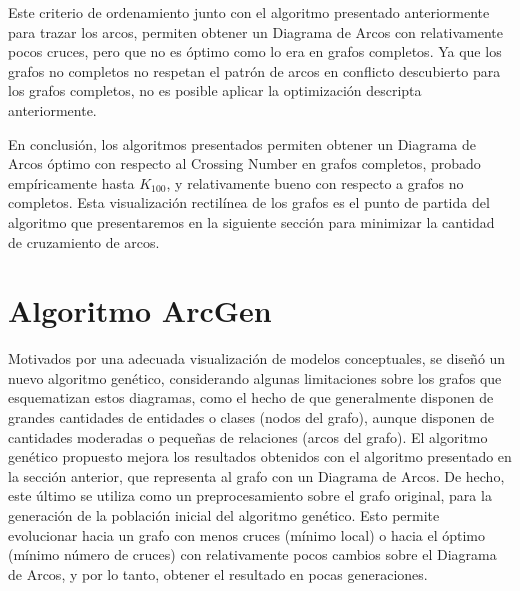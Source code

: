 	
	Este criterio de ordenamiento junto con el algoritmo presentado anteriormente  para trazar los arcos, permiten obtener un Diagrama de Arcos con relativamente pocos cruces, pero que  no es óptimo  como lo era en grafos completos. Ya que los grafos no completos  no respetan el patrón de arcos en conflicto descubierto para los grafos completos, 
	no es posible aplicar la optimización descripta anteriormente.
	
	En conclusión, los algoritmos presentados  permiten  obtener un Diagrama de Arcos óptimo con respecto al Crossing Number en grafos completos, probado empíricamente hasta $K_{100}$, y relativamente bueno con respecto a grafos no completos. Esta visualización rectilínea de los grafos es el  punto de partida del algoritmo  que presentaremos en la siguiente sección para minimizar la cantidad de cruzamiento de arcos. 
	

\section{Algoritmo ArcGen}
\label{sec:diseno_algoritmo_arcgen}

	
	Motivados por una adecuada visualización de  modelos conceptuales, se diseñó   un nuevo algoritmo genético, considerando algunas limitaciones sobre los grafos que esquematizan estos diagramas, como el  hecho de que 
	generalmente disponen de  grandes cantidades de entidades o clases (nodos del grafo), aunque disponen de cantidades moderadas o pequeñas de relaciones (arcos del grafo).
	El  algoritmo genético propuesto  mejora los resultados obtenidos con el algoritmo presentado en la sección anterior, que representa al grafo  con un Diagrama de Arcos. De hecho, este último se utiliza como un preprocesamiento sobre el grafo original,  para la generación de la población inicial del algoritmo genético.  Esto permite evolucionar  hacia  un grafo  con menos cruces (mínimo local) o  hacia el óptimo (mínimo número de cruces)  con  relativamente pocos cambios sobre el Diagrama de Arcos, y por lo tanto, obtener el resultado en  pocas generaciones. %
	
